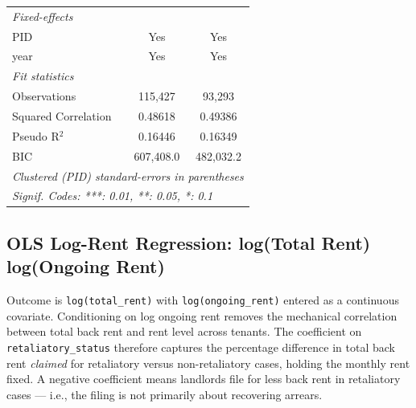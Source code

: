 \documentclass[
  11pt,
]{article}
\begin{document}
\begin{center}
{\begin{tabular}{lcc}
   \midrule
   \emph{Fixed-effects}\\
   PID                                                         & Yes           & Yes\\  
   year                                                        & Yes           & Yes\\  
   \midrule
   \emph{Fit statistics}\\
   Observations                                                & 115,427       & 93,293\\  
   Squared Correlation                                         & 0.48618       & 0.49386\\  
   Pseudo R$^2$                                                & 0.16446       & 0.16349\\  
   BIC                                                         & 607,408.0     & 482,032.2\\  
   \midrule \midrule
   \multicolumn{3}{l}{\emph{Clustered (PID) standard-errors in parentheses}}\\
   \multicolumn{3}{l}{\emph{Signif. Codes: ***: 0.01, **: 0.05, *: 0.1}}\\
\end{tabular}
}
\end{center}

\subsection{OLS Log-Rent Regression: log(Total Rent) \textbar{}
log(Ongoing
Rent)}\label{ols-log-rent-regression-logtotal-rent-logongoing-rent}

Outcome is \texttt{log(total\_rent)} with \texttt{log(ongoing\_rent)}
entered as a continuous covariate. Conditioning on log ongoing rent
removes the mechanical correlation between total back rent and rent
level across tenants. The coefficient on \texttt{retaliatory\_status}
therefore captures the percentage difference in total back rent
\emph{claimed} for retaliatory versus non-retaliatory cases, holding the
monthly rent fixed. A negative coefficient means landlords file for less
back rent in retaliatory cases --- i.e., the filing is not primarily
about recovering arrears.
\end{document}
